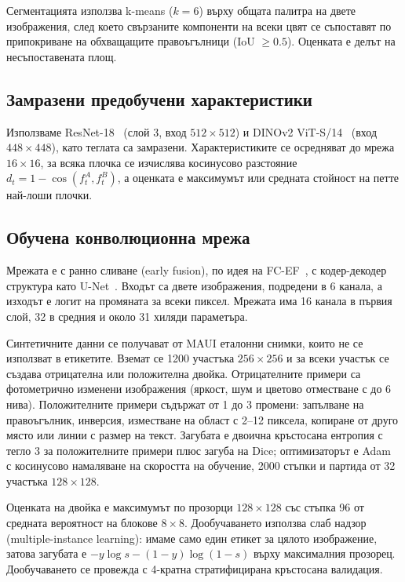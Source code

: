 \documentclass[a4paper,12pt]{article}
\begin{document}
Сегментацията използва k-means ($k=6$) върху общата палитра на двете изображения, след което свързаните компоненти на всеки цвят се съпоставят по припокриване на обхващащите правоъгълници (IoU $\ge 0.5$). Оценката е делът на несъпоставената площ.

\subsection{Замразени предобучени характеристики}
Използваме ResNet-18~\cite{he2016} (слой 3, вход $512\times512$) и DINOv2 ViT-S/14~\cite{oquab2024} (вход $448\times448$), като теглата са замразени. Характеристиките се осредняват до мрежа $16\times16$, за всяка плочка се изчислява косинусово разстояние $d_t = 1 - \cos(f_t^A, f_t^B)$, а оценката е максимумът или средната стойност на петте най-лоши плочки.

\subsection{Обучена конволюционна мрежа}
Мрежата е с ранно сливане (early fusion), по идея на FC-EF~\cite{daudt2018}, с кодер-декодер структура като U-Net~\cite{ronneberger2015}. Входът са двете изображения, подредени в 6 канала, а изходът е логит на промяната за всеки пиксел. Мрежата има 16 канала в първия слой, 32 в средния и около 31 хиляди параметъра.

Синтетичните данни се получават от MAUI еталонни снимки, които не се използват в етикетите. Вземат се 1200 участъка $256\times256$ и за всеки участък се създава отрицателна или положителна двойка. Отрицателните примери са фотометрично изменени изображения (яркост, шум и цветово отместване с до 6 нива). Положителните примери съдържат от 1 до 3 промени: запълване на правоъгълник, инверсия, изместване на област с 2–12 пиксела, копиране от друго място или линии с размер на текст. Загубата е двоична кръстосана ентропия с тегло 3 за положителните примери плюс загуба на Dice; оптимизаторът е Adam~\cite{kingma2015} с косинусово намаляване на скоростта на обучение, 2000 стъпки и партида от 32 участъка $128\times128$.

Оценката на двойка е максимумът по прозорци $128\times128$ със стъпка 96 от средната вероятност на блокове $8\times8$. Дообучаването използва слаб надзор (multiple-instance learning): имаме само един етикет за цялото изображение, затова загубата е $-y \log s - (1-y)\log(1-s)$ върху максималния прозорец. Дообучаването се провежда с 4-кратна стратифицирана кръстосана валидация.
\end{document}
